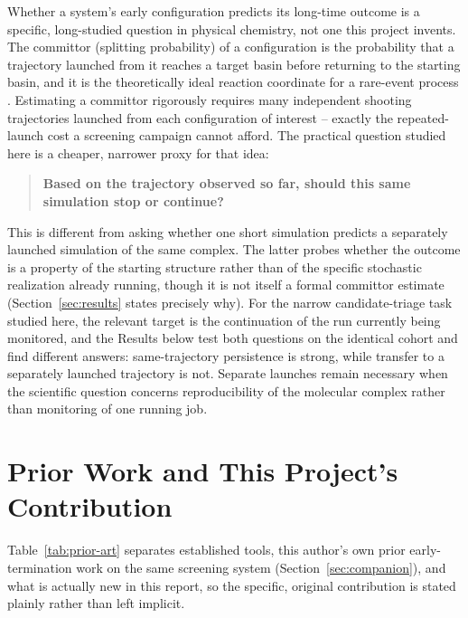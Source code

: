\documentclass[11pt]{article}
\begin{document}
Whether a system's early configuration predicts its long-time outcome is a specific, long-studied question in physical chemistry, not one this project invents. The committor (splitting probability) of a configuration is the probability that a trajectory launched from it reaches a target basin before returning to the starting basin, and it is the theoretically ideal reaction coordinate for a rare-event process \cite{bolhuis2002tps,e2006towards,peters2016reaction}. Estimating a committor rigorously requires many independent shooting trajectories launched from each configuration of interest -- exactly the repeated-launch cost a screening campaign cannot afford. The practical question studied here is a cheaper, narrower proxy for that idea:

\begin{quote}
\textbf{Based on the trajectory observed so far, should this same simulation stop or continue?}
\end{quote}

This is different from asking whether one short simulation predicts a separately launched simulation of the same complex. The latter probes whether the outcome is a property of the starting structure rather than of the specific stochastic realization already running, though it is not itself a formal committor estimate (Section~\ref{sec:results} states precisely why). For the narrow candidate-triage task studied here, the relevant target is the continuation of the run currently being monitored, and the Results below test both questions on the identical cohort and find different answers: same-trajectory persistence is strong, while transfer to a separately launched trajectory is not. Separate launches remain necessary when the scientific question concerns reproducibility of the molecular complex rather than monitoring of one running job.

\section{Prior Work and This Project's Contribution}

Table~\ref{tab:prior-art} separates established tools, this author's own prior early-termination work on the same screening system (Section~\ref{sec:companion}), and what is actually new in this report, so the specific, original contribution is stated plainly rather than left implicit.
\end{document}
